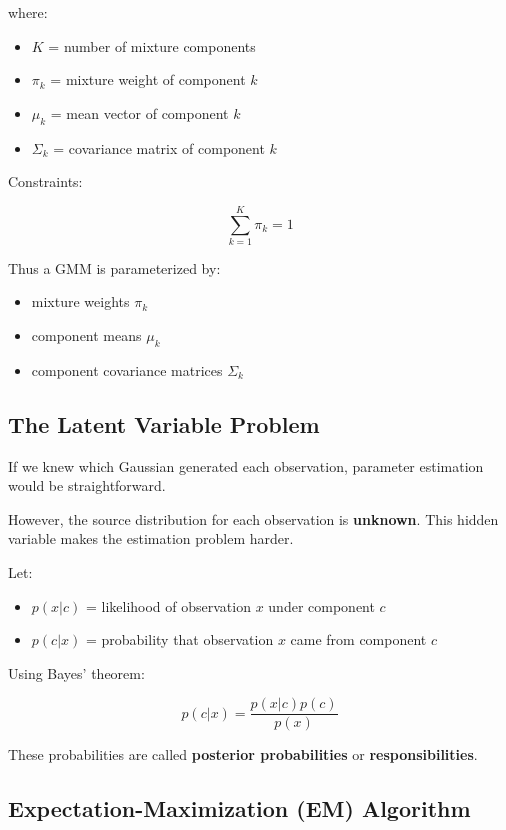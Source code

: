 \documentclass[10pt,a4paper]{article}
\begin{document}
	where:

	\begin{itemize}
		\item $K$ = number of mixture components
		\item $\pi_k$ = mixture weight of component $k$
		\item $\mu_k$ = mean vector of component $k$
		\item $\Sigma_k$ = covariance matrix of component $k$
	\end{itemize}

	Constraints:

	\[
	\sum_{k=1}^{K} \pi_k = 1
	\]

	Thus a GMM is parameterized by:

	\begin{itemize}
		\item mixture weights $\pi_k$
		\item component means $\mu_k$
		\item component covariance matrices $\Sigma_k$
	\end{itemize}

	\subsection{The Latent Variable Problem}

	If we knew which Gaussian generated each observation, parameter estimation would be straightforward.

	However, the source distribution for each observation is \textbf{unknown}.
	This hidden variable makes the estimation problem harder.

	Let:

	\begin{itemize}
		\item $p(x|c)$ = likelihood of observation $x$ under component $c$
		\item $p(c|x)$ = probability that observation $x$ came from component $c$
	\end{itemize}

	Using Bayes' theorem:

	\[
	p(c|x) =
	\frac{p(x|c)p(c)}{p(x)}
	\]

	These probabilities are called \textbf{posterior probabilities} or \textbf{responsibilities}.

	\subsection{Expectation-Maximization (EM) Algorithm}
\end{document}
